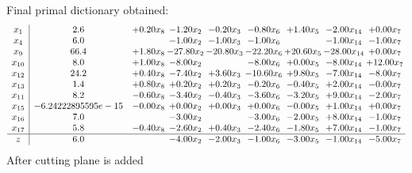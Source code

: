\documentclass[8pt]{article}
\begin{document}
 Final primal dictionary obtained: 
\[\begin{array}{c| c c@{\hskip 2pt} c@{\hskip 2pt} c@{\hskip 2pt} c@{\hskip 2pt} c@{\hskip 2pt} c@{\hskip 2pt} c@{\hskip 2pt} }
 x_{1}   &  2.6 & +  0.20 x_{8} & -1.20 x_{2} & -0.20 x_{3} & -0.80 x_{6} & +  1.40 x_{5} & -2.00 x_{14} & +  0.00 x_{7}\\
 x_{4}   &  6.0  &   & -1.00 x_{2} & -1.00 x_{3} & -1.00 x_{6} &   & -1.00 x_{14} & -1.00 x_{7}\\
 x_{9}   &  66.4 & +  1.80 x_{8} & -27.80 x_{2} & -20.80 x_{3} & -22.20 x_{6} & + 20.60 x_{5} & -28.00 x_{14} & +  0.00 x_{7}\\
 x_{10}   &  8.0 & +  1.00 x_{8} & -8.00 x_{2} &   & -8.00 x_{6} & +  0.00 x_{5} & -8.00 x_{14} & + 12.00 x_{7}\\
 x_{12}   &  24.2 & +  0.40 x_{8} & -7.40 x_{2} & +  3.60 x_{3} & -10.60 x_{6} & +  9.80 x_{5} & -7.00 x_{14} & -8.00 x_{7}\\
 x_{13}   &  1.4 & +  0.80 x_{8} & +  0.20 x_{2} & +  0.20 x_{3} & -0.20 x_{6} & -0.40 x_{5} & +  2.00 x_{14} & -0.00 x_{7}\\
 x_{11}   &  8.2 & -0.60 x_{8} & -3.40 x_{2} & -0.40 x_{3} & -3.60 x_{6} & -3.20 x_{5} & +  9.00 x_{14} & -2.00 x_{7}\\
 x_{15}   &  -6.24222895595e-15 & -0.00 x_{8} & +  0.00 x_{2} & +  0.00 x_{3} & +  0.00 x_{6} & -0.00 x_{5} & +  1.00 x_{14} & +  0.00 x_{7}\\
 x_{16}   &  7.0  &   & -3.00 x_{2} &   & -3.00 x_{6} & -2.00 x_{5} & +  8.00 x_{14} & -1.00 x_{7}\\
 x_{17}   &  5.8 & -0.40 x_{8} & -2.60 x_{2} & +  0.40 x_{3} & -2.40 x_{6} & -1.80 x_{5} & +  7.00 x_{14} & -1.00 x_{7}\\
\hline
z    &  6.0  &   & -4.00 x_{2} & -2.00 x_{3} & -1.00 x_{6} & -3.00 x_{5} & -1.00 x_{14} & -5.00 x_{7}\\
\end{array}\]
 After cutting plane is added 
\end{document}
